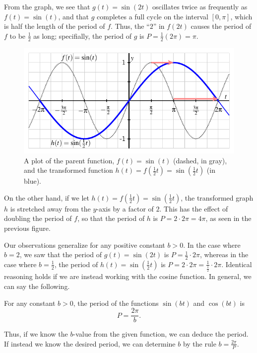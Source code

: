 \documentclass{ximera}
\begin{document}
From the graph, we see that \(g(t) = \sin(2t)\) oscillates twice as frequently as \(f(t) = \sin(t)\), and that \(g\) completes a full cycle on the interval \([0,\pi]\), which is half the length of the period of \(f\).  Thus, the  ``\(2\)'' in \(f(2t)\) causes the period of \(f\) to be \(\frac{1}{2}\) as long; specifially, the period of \(g\) is \(P = \frac{1}{2} (2\pi) = \pi\).%
\begin{figure}
\centering
\includegraphics[width=0.75\linewidth]{images/sinusoidal-sine-horiz-scaling-2}
\caption{A plot of the parent function, \(f(t) = \sin(t)\) (dashed, in gray), and the transformed function \(h(t) = f(\frac{1}{2}t) = \sin(\frac{1}{2}t)\) (in blue).\label{F-sinusoidal-sine-stretched}}
\end{figure}

On the other hand, if we let \(h(t) = f(\frac{1}{2}t) = \sin(\frac{1}{2}t)\), the transformed graph \(h\) is stretched away from the \(y\)-axis by a factor of \(2\).  This has the effect of doubling the period of \(f\), so that the period of \(h\) is \(P = 2 \cdot 2\pi = 4\pi\), as seen in the previous figure.%

Our observations generalize for any positive constant \(b \gt 0\).  In the case where \(b = 2\), we saw that the period of \(g(t) = \sin(2t)\) is \(P = \frac{1}{2} \cdot 2\pi\), whereas in the case where \(b = \frac{1}{2}\), the period of \(h(t) = \sin(\frac{1}{2}t)\) is \(P = 2 \cdot 2\pi = \frac{1}{\frac{1}{2}} \cdot 2\pi\).  Identical reasoning holds if we are instead working with the cosine function.  In general, we can say the following.%

For any constant \(b \gt 0\), the period of the functions \(\sin(bt)\) and \(\cos(bt)\) is%
\[
P = \frac{2\pi}{b}\text{.}
\]
%

Thus, if we know the \(b\)-value from the given function, we can deduce the period.  If instead we know the desired period, we can determine \(b\) by the rule \(b = \frac{2\pi}{P}\).%
\end{document}
